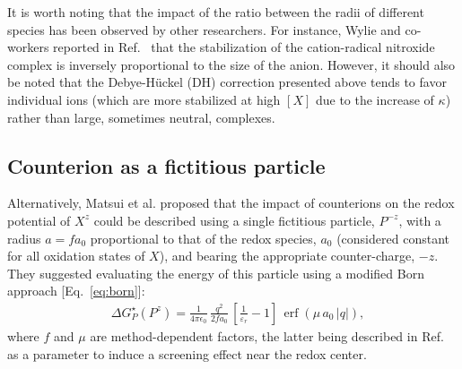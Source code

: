 \documentclass[review,preprint]{elsarticle}
\DeclareMathOperator{\erf}{erf}
\begin{document}
It is worth noting that the impact of the ratio between the radii of different species has been observed by other researchers. For instance, Wylie and co-workers reported in Ref.~ that the stabilization of the cation-radical nitroxide complex is inversely proportional to the size of the anion. However, it should also be noted that the Debye-Hückel (DH) correction presented above tends to favor individual ions (which are more stabilized at high $[X]$ due to the increase of $\kappa$) rather than large, sometimes neutral, complexes.


\subsection{Counterion as a fictitious particle}

Alternatively, Matsui et al. \cite{matsuiDensityFunctionalTheory2013} proposed that the impact of counterions on the redox potential of $X^z$ could be described using a single fictitious particle, $P^{-z}$, with a radius $a=fa_0$ proportional to that of the redox species, $a_0$ (considered constant for all oxidation states of $X$), and bearing the appropriate counter-charge, $-z$. They suggested evaluating the energy of this particle using a modified Born approach [Eq.~\eqref{eq:born}]:\begin{align}
	&\Delta G^\star_{P}(P^z) = \frac{1}{4\pi\epsilon_0}\, \frac{q^2}{2fa_0}\,\left[\frac{1}{\varepsilon_r}-1\right]\,\erf(\mu\,a_0\,|q|),
\end{align}
where $f$ and $\mu$ are method-dependent factors, the latter being described in Ref.~\cite{matsuiDensityFunctionalTheory2013} as a parameter to induce a screening effect near the redox center.
\end{document}
